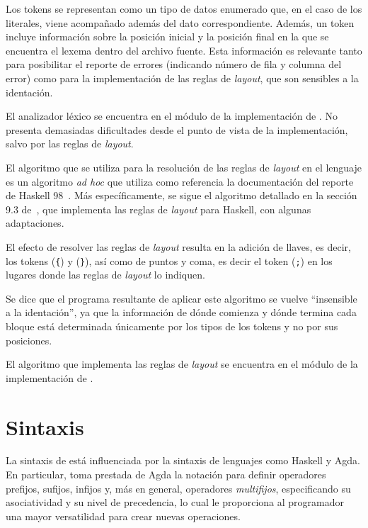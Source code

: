 Los tokens se representan como un tipo de datos enumerado que, en el caso
de los literales, viene acompañado además del dato correspondiente.
Además, un token incluye información sobre la posición inicial y
la posición final en la que se encuentra el lexema dentro del archivo fuente.
Esta información es relevante tanto para posibilitar el reporte de errores
(indicando número de fila y columna del error)
como para la implementación de las reglas de {\em layout}, que son sensibles
a la identación.

El analizador léxico se encuentra en el módulo
 de la implementación de \nuflo.
No presenta demasiadas dificultades
desde el punto de vista de la implementación,
salvo por las reglas de {\em layout}.
\medskip


El algoritmo que se utiliza para la resolución de las reglas de
{\em layout} en el lenguaje es un algoritmo
{\em ad hoc} que utiliza como referencia la documentación del
reporte de Haskell 98~\cite{jones2003haskell}.
Más específicamente, se sigue el algoritmo detallado en la sección 9.3
de~\cite{jones2003haskell}, que implementa las reglas de {\em layout} para Haskell,
con algunas adaptaciones.

El efecto de resolver las reglas de {\em layout}
resulta en la adición de llaves, es decir,
los tokens  (\verb|{|) y  (\verb|}|),
así como de puntos y coma,
es decir el token  (\verb|;|)
en los lugares donde las reglas de {\em layout} lo indiquen.

Se dice que el programa resultante de aplicar este algoritmo
se vuelve ``insensible a la identación'',
ya que la información de dónde comienza y dónde termina cada bloque
está determinada únicamente por los tipos de los tokens y no por
sus posiciones.

El algoritmo que implementa las reglas de {\em layout} se encuentra en
el módulo  de la implementación de \nuflo.

\section{Sintaxis}

La sintaxis de \nuflo está influenciada por la sintaxis de lenguajes
como Haskell y Agda.
En particular, \nuflo toma prestada de Agda
la notación para definir operadores prefijos, sufijos, infijos y,
más en general, operadores {\em multifijos}, especificando
su asociatividad y su nivel de precedencia,
lo cual le proporciona al programador una mayor versatilidad para crear
nuevas operaciones.

